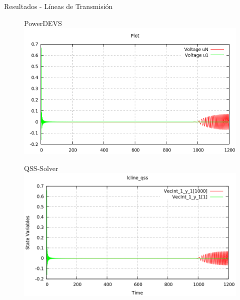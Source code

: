 \documentclass[10pt,handout]{beamer}
\begin{document}
\begin{frame}{Resultados - Líneas de Transmisión}
\begin{figure}[H]
\begin{minipage}{0.5\textwidth}
\centering
PowerDEVS\\
\includegraphics[width=\linewidth]{lcline-pd}
\end{minipage}\hfill\begin{minipage}{0.5\textwidth}
\centering
QSS-Solver\\
 \includegraphics[width=\linewidth]{lcline-qss}
\end{minipage}
\end{figure}
\end{frame}
\end{document}
